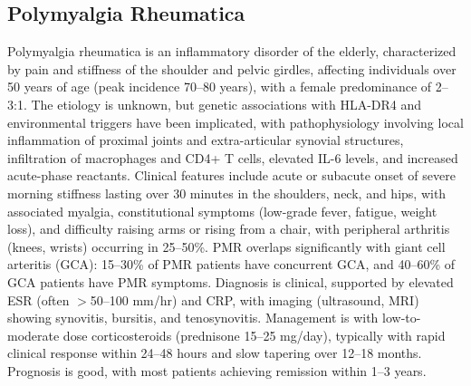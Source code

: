 \subsection{Polymyalgia Rheumatica}
\label{sec:Polymyalgia Rheumatica}
Polymyalgia rheumatica is an inflammatory disorder of the elderly, characterized by pain and stiffness of the shoulder and pelvic girdles, affecting individuals over 50 years of age (peak incidence 70--80 years), with a female predominance of 2--3:1. The etiology is unknown, but genetic associations with HLA-DR4 and environmental triggers have been implicated, with pathophysiology involving local inflammation of proximal joints and extra-articular synovial structures, infiltration of macrophages and CD4+ T cells, elevated IL-6 levels, and increased acute-phase reactants. Clinical features include acute or subacute onset of severe morning stiffness lasting over 30 minutes in the shoulders, neck, and hips, with associated myalgia, constitutional symptoms (low-grade fever, fatigue, weight loss), and difficulty raising arms or rising from a chair, with peripheral arthritis (knees, wrists) occurring in 25--50\%. PMR overlaps significantly with giant cell arteritis (GCA): 15--30\% of PMR patients have concurrent GCA, and 40--60\% of GCA patients have PMR symptoms. Diagnosis is clinical, supported by elevated ESR (often $>$50--100 mm/hr) and CRP, with imaging (ultrasound, MRI) showing synovitis, bursitis, and tenosynovitis. Management is with low-to-moderate dose corticosteroids (prednisone 15--25 mg/day), typically with rapid clinical response within 24--48 hours and slow tapering over 12--18 months. Prognosis is good, with most patients achieving remission within 1--3 years.

